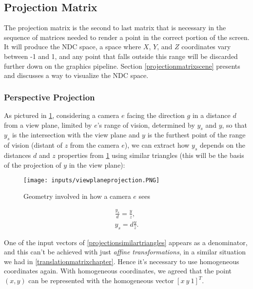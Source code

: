 \documentclass[cic,tc,english]{iiufrgs}
\begin{document}
\subsection{Projection Matrix}

The projection matrix is the second to last matrix that is necessary in the sequence of matrices needed to render a point in the correct portion of the screen. It will produce the NDC space, a space where $X$, $Y$, and $Z$ coordinates vary between -1 and 1, and any point that falls outside this range will be discarded further down on the graphics pipeline. Section \ref{projectionmatrixscene} presents and discusses a way to visualize the NDC space.

\subsubsection{Perspective Projection}
\label{perspectiveprojection}
As pictured in \cref{geometryofperspective}, considering a camera $e$ facing the direction $g$ in a distance $d$ from a view plane, limited by $e$'s range of vision, determined by $y_s$ and $y$, so that  $y_s$ is the intersection with the view plane and $y$ is the furthest point of the range of vision (distant of $z$ from the camera $e$), we can extract how $y_s$ depends on the distances $d$ and $z$ properties from \cref{geometryofperspective} using similar triangles (this will be the basis of the projection of $y$ in the view plane):

\begin{figure}[hbt!]
    \caption{Geometry involved in how a camera $e$ sees}
    \begin{center}
        \texttt{[image: inputs/viewplaneprojection.PNG]}
    \end{center}
    \label{geometryofperspective}
\end{figure}



\begin{equation}
    \label{projectionsimilartriangles}
    \begin{array}{lc}
        \frac{y_s}{d} = \frac{y}{z},  \\
        y_s = d \frac{y}{z}.
    \end{array}
\end{equation}

One of the input vectors of \cref{projectionsimilartriangles} appears as a denominator, and this can't be achieved with just \textit{affine transformations}, in a similar situation we had in \cref{translationmatrixchapter}. Hence it's necessary to use homogeneous coordinates again. With homogeneous coordinates, we agreed that the point $(x,y)$ can be represented with the homogeneous vector $[x\ y\ 1]^T$.
\end{document}
